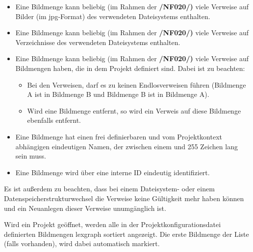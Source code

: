 	\begin{itemize}
		
		\item Eine Bildmenge kann beliebig (im Rahmen der \textbf{/NF020/)} viele Verweise auf Bilder (im \gls{jpg}-Format) des verwendeten Dateisystems enthalten.
		
		\item Eine Bildmenge kann beliebig (im Rahmen der \textbf{/NF020/)} viele Verweise auf Verzeichnisse des verwendeten Dateisystems enthalten.
		
		\item Eine Bildmenge kann beliebig (im Rahmen der \textbf{/NF020/)} viele Verweise auf Bildmengen haben, die in dem Projekt definiert sind. Dabei ist zu beachten:
		
			\begin{itemize}
			
				\item Bei den Verweisen, darf es zu keinen Endlosverweisen führen (Bildmenge A ist in Bildmenge B und Bildmenge B ist in Bildmenge A).
				
				\item Wird eine Bildmenge entfernt, so wird ein Verweis auf diese Bildmenge ebenfalls entfernt.
			
			\end{itemize}
		
		\item Eine Bildmenge hat einen frei definierbaren und vom Projektkontext abhängigen eindeutigen Namen, der zwischen einem und 255 Zeichen lang sein muss.
		
		\item Eine Bildmenge wird über eine interne ID eindeutig identifiziert.
	
	\end{itemize}
	
	Es ist außerdem zu beachten, dass bei einem Dateisystem- oder einem Datenspeicherstrukturwechsel die Verweise keine Gültigkeit mehr haben können und ein Neuanlegen dieser Verweise unumgänglich ist.\par Wird ein Projekt geöffnet, werden alle in der Projektkonfigurationsdatei definierten Bildmengen \gls{lexgraph} sortiert angezeigt. Die erste Bildmenge der Liste (falls vorhanden), wird dabei automatisch markiert.
	
